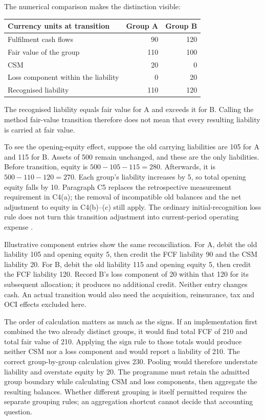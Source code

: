 The numerical comparison makes the distinction visible:
\begin{center}
\begin{tabular}{lrr}
\toprule
Currency units at transition & Group A & Group B \\
\midrule
Fulfilment cash flows & 90 & 120 \\
Fair value of the group & 110 & 100 \\
CSM & 20 & 0 \\
Loss component within the liability & 0 & 20 \\
Recognised liability & 110 & 120 \\
\bottomrule
\end{tabular}
\end{center}
The recognised liability equals fair value for A and exceeds it for B.
Calling the method fair-value transition therefore does not mean that every
resulting liability is carried at fair value.

\clearpage
To see the opening-equity effect, suppose the old carrying liabilities are
105 for A and 115 for B. Assets of 500 remain unchanged, and these are the
only liabilities. Before transition, equity is $500-105-115=280$. Afterwards,
it is $500-110-120=270$. Each group's liability increases by 5, so total
opening equity falls by 10. Paragraph C5 replaces the retrospective
measurement requirement in C4(a); the removal of incompatible old balances
and the net adjustment to equity in C4(b)--(c) still apply. The ordinary
initial-recognition loss rule does not turn this transition adjustment into
current-period operating expense \citep[paragraphs C4--C5]{aasb17}.

Illustrative component entries show the same reconciliation. For A, debit
the old liability 105 and opening equity 5, then credit the FCF liability 90
and the CSM liability 20. For B, debit the old liability 115 and opening
equity 5, then credit the FCF liability 120. Record B's loss component of 20
within that 120 for its subsequent allocation; it produces no additional
credit. Neither entry changes cash. An actual transition would also need the
acquisition, reinsurance, tax and OCI effects excluded here.

The order of calculation matters as much as the signs. If an implementation
first combined the two already distinct groups, it would find total FCF of
210 and total fair value of 210. Applying the sign rule to those totals would
produce neither CSM nor a loss component and would report a liability of 210.
The correct group-by-group calculation gives 230. Pooling would therefore
understate liability and overstate equity by 20. The programme must retain
the admitted group boundary while calculating CSM and loss components, then
aggregate the resulting balances. Whether different grouping is itself
permitted requires the separate grouping rules; an aggregation shortcut
cannot decide that accounting question.

